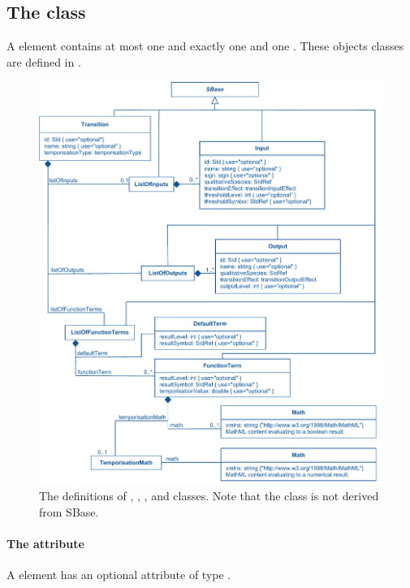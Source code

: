 


\subsection{The  class}
\label{transitions-class}
A \Transition element contains at most one \ListOfInputs and exactly one \ListOfOutputs and one \ListOfFunctionTerms. These objects classes are defined in .

\begin{figure}
  \includegraphics{figs/qual-transition-uml.pdf}
  \caption{The definitions of \Transition, \Input, \Output, \DefaultTerm and \FunctionTerm classes. Note that the \DefaultTerm class is not derived from SBase. }
  \label{qual-transition-uml}
\end{figure}

\paragraph{The  attribute}
A \Transition element has an optional  attribute of type . 

